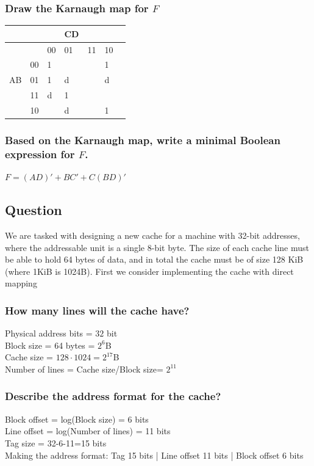 \documentclass[12pt, a4paper]{article}
\begin{document}
			\subsubsection{Draw the Karnaugh map for $F$}
				\begin{table}[h!]
				\begin{tabular}{l|l|l|l|l|l|l|}
					&&&CD&&\\
					\hline
					&&00&01&11&10\\
					\hline
					&00&1&&&1\\
					\hline
					AB&01&1&d&&d\\
					\hline
					&11&d&1&&\\
					\hline
					&10&&d&&1\\
					\hline
				\end{tabular}
				\end{table}
			\subsubsection{ Based on the Karnaugh map, write a minimal Boolean expression for $F$.}
				$F=(AD)'+BC'+C(BD)'$
		\subsection{Question}
			We are tasked with designing a new cache for a machine with 32-bit addresses, where the addressable unit is a single 8-bit byte. The size of each cache line must be able to hold 64 bytes of data, and in total the cache must be of size 128 KiB (where 1KiB is 1024B). First we consider implementing the cache with direct mapping\\
			\subsubsection{How many lines will the cache have?}
				Physical address bits = $32$ bit\\
				Block size = 64 bytes = $2^6$B\\
				Cache size = $128\cdot 1024=2^{17}$B\\
				Number of lines = Cache size/Block size= $2^{11}$
			\subsubsection{Describe the address format for the cache?}
				Block offset = log(Block size) = 6 bits\\
				Line offset = log(Number of lines) = 11 bits\\
				Tag size = 32-6-11=15 bits\\
				Making the address format: Tag 15 bits | Line offset 11 bits | Block offset 6 bits
\end{document}
